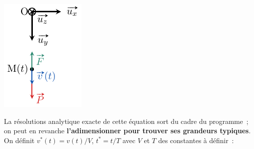 \documentclass[../../main/main.tex]{subfiles}
\begin{document}
\begin{tcb*}
\begin{isd}[righthand ratio=.20]
\begin{center}
{				\includegraphics[width=\linewidth]{cl_fq_prof}
			}%
			\captionsetup{justification=centering}
		\end{center}
	\end{isd}
	La résolutions analytique exacte de cette équation sort du cadre du
	programme~; on peut en revanche \textbf{l'adimensionner pour trouver ses
		grandeurs typiques}. On définit $v^*(t) = v(t)/V$, $t^* = t/T$ avec $V$ et $T$
	des constantes à définir~:
	\smallbreak
	\begin{isd}
\end{isd}
\end{tcb*}
\end{document}
